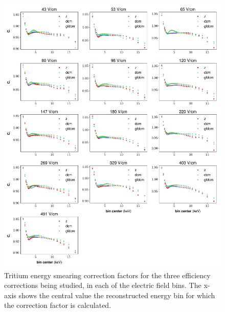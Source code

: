 \begin{figure}[h!]
\centering
\includegraphics[width=\textwidth]{Figures/H3_Ce_prelim.pdf}
\caption{Tritium energy smearing correction factors for the three efficiency corrections being studied, in each of the electric field bins. The x-axis shows the central value the reconstructed energy bin for which the correction factor is calculated.}
\label{fig:H3_Ce_prelim}
\end{figure}


